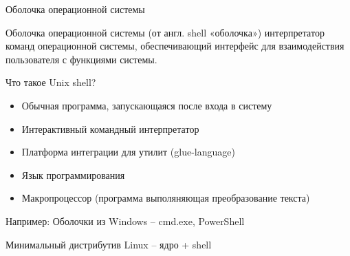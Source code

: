 \begin{frame}[fragile]{Оболочка операционной системы}

     \begin{block}{Оболочка операционной системы}
     (от англ. shell «оболочка») \alert{интерпретатор команд} операционной системы, обеспечивающий интерфейс для взаимодействия пользователя с функциями системы.  
     \end{block}

     Что такое Unix shell?
     \begin{itemize}
        \item Обычная программа, запускающаяся после входа в систему
	\pause
        \item Интерактивный командный интерпретатор
	\pause
        \item Платформа интеграции для утилит (glue-language)
	\pause
        \item Язык программирования
	\pause
        \item Макропроцессор (программа выполяняющая преобразование текста)
     \end{itemize}

        Например:
	\pause
	Оболочки из Windows --  cmd.exe, PowerShell

	Минимальный дистрибутив Linux -- ядро + shell 

\end{frame}
